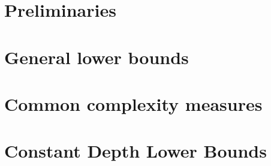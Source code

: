 \onehalfspace





\tableofcontents





\part{Preliminaries}









%



\part{General lower bounds}









\part{Common complexity measures}





\part{Constant Depth Lower Bounds}














